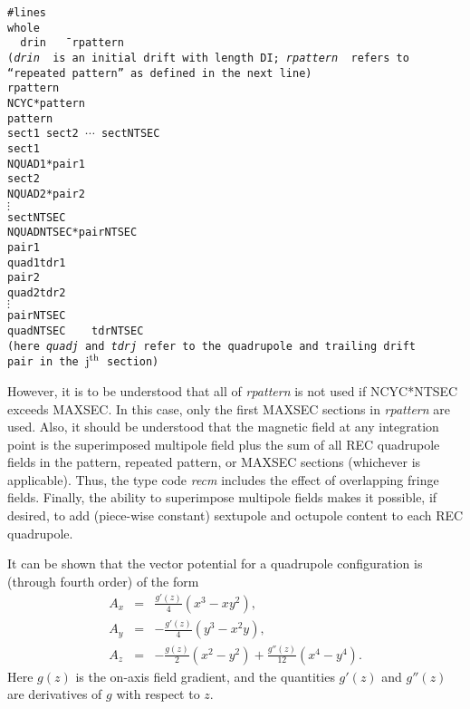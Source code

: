 \begin{tabbing}
\tt \#lines\\
\tt whole\\
 \ \ \=\tt drin\ \ \= \  \ \=\tt rpattern\\
        \>\> ({\em drin } is an initial drift with length DI;  {\em rpattern } refers to\\
        \>\> ``repeated pattern'' as defined in the next line)\\
\tt rpattern\\
\>\tt  NCYC*pattern\\
\tt pattern\\
\>\tt  sect1           \>\>\tt sect2 $\cdots$ sectNTSEC\\
\tt sect1\\
\>\tt   NQUAD1*pair1\\
\tt sect2\\
\>\tt   NQUAD2*pair2\\
\>\>\>$\vdots$ \\
\tt sectNTSEC\\
\>\tt NQUADNTSEC*pairNTSEC\\
\tt pair1\\
\>\tt quad1\>\>\tt tdr1\\
\tt pair2\\
\>\tt quad2\>\>\tt tdr2\\
\>\>\>$\vdots$\\
\tt pairNTSEC\\
\>\tt quadNTSEC\ \ \ \ tdrNTSEC\\
\>\>(here {\em quadj} and {\em tdrj} refer to the quadrupole and trailing drift\\
\>\>pair in the $\mbox{j}^{\mbox{\scriptsize th}}$ section)
\end{tabbing}
However, it is to be understood that all of {\em rpattern} is not used if NCYC*NTSEC exceeds MAXSEC.  In this case, only the first MAXSEC sections in {\em rpattern } are used.  Also, it should be understood that the magnetic field at any integration point is the superimposed multipole field plus the sum of all REC quadrupole fields in the pattern, repeated pattern, or MAXSEC sections (whichever is applicable).  Thus, the type code {\em recm} includes the effect of overlapping fringe fields.  Finally, the ability to superimpose multipole fields makes it possible, if desired, to add (piece-wise constant) sextupole and octupole content to each REC quadrupole.

It can be shown that the vector potential for a quadrupole configuration is (through fourth order) of the form
\begin{eqnarray*}
A_x &=&  \frac{g'(z)}{4}(x^3-xy^2),\\
A_y &=&  -\frac{g'(z)}{4}(y^3-x^2 y),\\
A_z &=&  -\frac{g(z)}{2} (x^2-y^2) + \frac{g''(z)}{12} (x^4-y^4).
\end{eqnarray*}
Here $g(z)$ is the on-axis field gradient, and the quantities $g'(z)$ and $g''(z)$ are derivatives of $g$ with respect to $z$.

